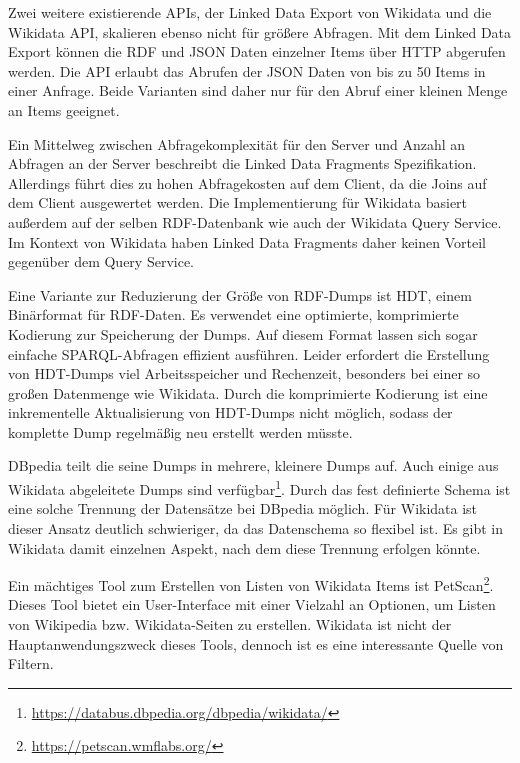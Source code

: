 Zwei weitere existierende APIs, der Linked Data Export von Wikidata und die Wikidata API, skalieren ebenso nicht für größere Abfragen.
Mit dem Linked Data Export können die RDF und JSON Daten einzelner Items über HTTP abgerufen werden.
Die API erlaubt das Abrufen der JSON Daten von bis zu 50 Items in einer Anfrage.
Beide Varianten sind daher nur für den Abruf einer kleinen Menge an Items geeignet.

Ein Mittelweg zwischen Abfragekomplexität für den Server und Anzahl an Abfragen an der Server beschreibt die Linked Data Fragments\cite{ldf} Spezifikation.
Allerdings führt dies zu hohen Abfragekosten auf dem Client, da die Joins auf dem Client ausgewertet werden.
Die Implementierung für Wikidata basiert außerdem auf der selben RDF-Datenbank wie auch der Wikidata Query Service.
Im Kontext von Wikidata haben Linked Data Fragments daher keinen Vorteil gegenüber dem Query Service.

Eine Variante zur Reduzierung der Größe von RDF-Dumps ist HDT\cite{hdt}, einem Binärformat für RDF-Daten.
Es verwendet eine optimierte, komprimierte Kodierung zur Speicherung der Dumps.
Auf diesem Format lassen sich sogar einfache SPARQL-Abfragen effizient ausführen\cite{hdt-query}.
Leider erfordert die Erstellung von HDT-Dumps viel Arbeitsspeicher und Rechenzeit, besonders bei einer so großen Datenmenge wie Wikidata.
Durch die komprimierte Kodierung ist eine inkrementelle Aktualisierung von HDT-Dumps nicht möglich, sodass der komplette Dump regelmäßig neu erstellt werden müsste.

DBpedia\cite{dbpedia} teilt die seine Dumps in mehrere, kleinere Dumps auf.
Auch einige aus Wikidata abgeleitete Dumps sind verfügbar\footnote{\url{https://databus.dbpedia.org/dbpedia/wikidata/}}.
Durch das fest definierte Schema ist eine solche Trennung der Datensätze bei DBpedia möglich.
Für Wikidata ist dieser Ansatz deutlich schwieriger, da das Datenschema so flexibel ist.
Es gibt in Wikidata damit einzelnen Aspekt, nach dem diese Trennung erfolgen könnte.

Ein mächtiges Tool zum Erstellen von Listen von Wikidata Items ist PetScan\footnote{\url{https://petscan.wmflabs.org/}}.
Dieses Tool bietet ein User-Interface mit einer Vielzahl an Optionen, um Listen von Wikipedia bzw. Wikidata-Seiten zu erstellen.
Wikidata ist nicht der Hauptanwendungszweck dieses Tools, dennoch ist es eine interessante Quelle von Filtern.